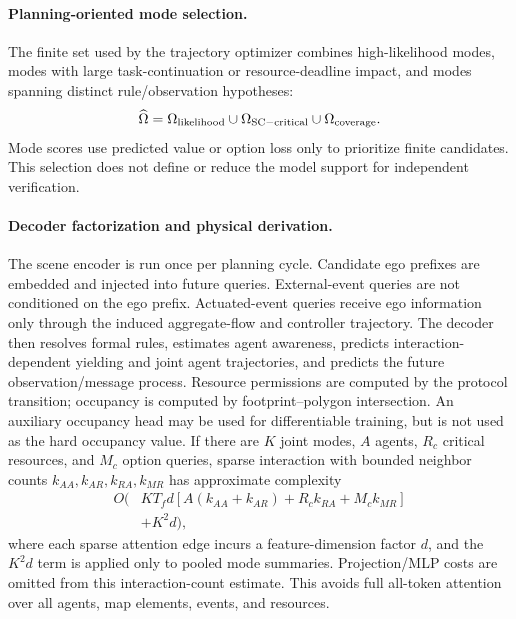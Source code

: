 \documentclass[letterpaper]{article} %
\begin{document}
\paragraph{Planning-oriented mode selection.}
The finite set used by the trajectory optimizer combines high-likelihood modes, modes with large task-continuation or resource-deadline impact, and modes spanning distinct rule/observation hypotheses:
\begin{equation}
\widehat\Omega=\Omega_{\rm likelihood}\cup\Omega_{\rm SC-critical}\cup\Omega_{\rm coverage}.
\label{eq:mode-selection}
\end{equation}
Mode scores use predicted value or option loss only to prioritize finite candidates. This selection does not define or reduce the model support for independent verification.

\paragraph{Decoder factorization and physical derivation.}
The scene encoder is run once per planning cycle. Candidate ego prefixes are embedded and injected into future queries. External-event queries are not conditioned on the ego prefix. Actuated-event queries receive ego information only through the induced aggregate-flow and controller trajectory. The decoder then resolves formal rules, estimates agent awareness, predicts interaction-dependent yielding and joint agent trajectories, and predicts the future observation/message process. Resource permissions are computed by the protocol transition; occupancy is computed by footprint--polygon intersection. An auxiliary occupancy head may be used for differentiable training, but is not used as the hard occupancy value. If there are $K$ joint modes, $A$ agents, $R_c$ critical resources, and $M_c$ option queries, sparse interaction with bounded neighbor counts $k_{AA},k_{AR},k_{RA},k_{MR}$ has approximate complexity
\begin{equation}
\begin{aligned}
O\!\big(&KT_f d[A(k_{AA}+k_{AR})+R_c k_{RA}+M_c k_{MR}]\\
&+K^2d\big),
\end{aligned}
\label{eq:complexity}
\end{equation}
where each sparse attention edge incurs a feature-dimension factor $d$, and the $K^2d$ term is applied only to pooled mode summaries. Projection/MLP costs are omitted from this interaction-count estimate. This avoids full all-token attention over all agents, map elements, events, and resources.
\end{document}
